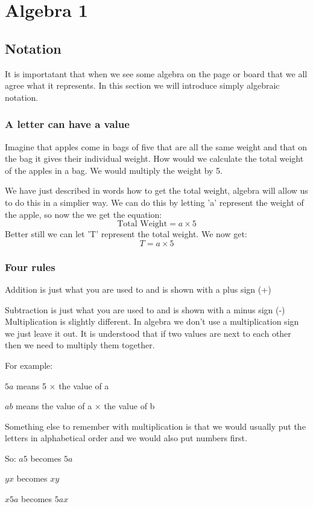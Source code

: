 \chapter{Algebra 1}
\section{Notation}
It is importatant that when we see some algebra on the page or board that we all agree what it represents.  In this section we will introduce simply algebraic notation.
\subsection{A letter can have a value}
Imagine that apples come in bags of five that are all the same weight and that on the bag it gives their individual weight.  How would we calculate the total weight of the apples in a bag.  We would multiply the weight by 5. 

We have just described in words how to get the total weight, algebra will allow us to do this in a simplier way.  We can do this by letting 'a' represent the weight of the apple, so now the we get the equation:
$$\mbox{Total Weight} = a \times 5$$
Better still we can let 'T' represent the total weight. We now get:
$$T=a \times 5$$
\subsection{Four rules}

Addition is just what you are used to and is shown with a plus sign (+)

\noindent Subtraction is just what you are used to and is shown with a minus sign (-)
\noindent Multiplication is slightly different.  In algebra we don't use a multiplication sign we just leave it out.  It is understood that if two values are next to each other then we need to multiply them together.

For example:

$5a$ means 5 $\times$ the value of a

$ab$ means the value of a $\times$ the value of b

\noindent Something else to remember with multiplication is that we would usually put the letters in alphabetical order and we would also put numbers first.

So:
$a5$ becomes $5a$

$yx$ becomes $xy$

$x5a$ becomes $5ax$

